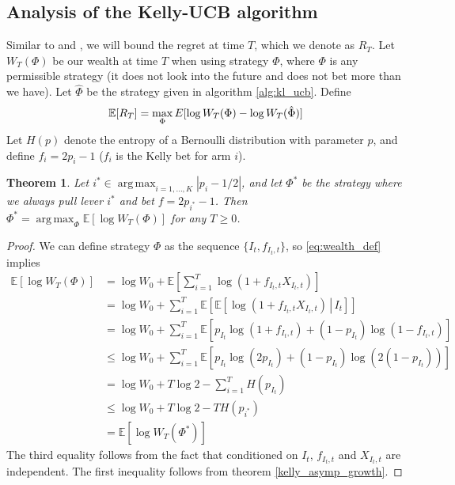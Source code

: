 \documentclass[letterpaper]{article}
\DeclareMathOperator*{\argmax}{arg\,max}
\numberwithin{equation}{section}
\theoremstyle{plain}
\newtheorem{thm}{Theorem}[section]
\begin{document}
\subsection{Analysis of the Kelly-UCB algorithm}\label{analysiskellyucb}
Similar to \cite{cappe2013kullback} and \cite{bubeck2012regret}, we will bound the regret at time $T$, which we denote as $R_T$. Let $W_T(\Phi)$ be our wealth at time $T$ when using strategy $\Phi$, where $\Phi$ is any permissible strategy (it does not look into the future and does not bet more than we have). Let $\hat{\Phi}$ be the strategy given in algorithm \ref{alg:kl_ucb}. Define
\begin{equation}\label{eq:regret_def}
\mathbb{E}[R_T] = \max_\Phi E[\log W_T(\Phi) - \log W_T(\hat{\Phi})]\\
\end{equation}
Let $H(p)$ denote the entropy of a Bernoulli distribution with parameter $p$, and define $f_i = 2p_i-1$ ($f_i$ is the Kelly bet for arm $i$).
\begin{thm}\label{thm:kelly_optimal_mab}
Let $i^*\in\argmax_{i=1,\ldots,K}|p_i-1/2|$, and let $\Phi^*$ be the strategy where we always pull lever $i^*$ and bet $f = 2p_{i^*}-1$. Then $\Phi^* = \argmax_{\Phi} \mathbb{E}[\log W_T(\Phi)]$ for any $T \ge 0$.
\end{thm}
\begin{proof}
We can define strategy $\Phi$ as the sequence $\{I_t,f_{I_t,t}\}$, so \eqref{eq:wealth_def} implies
\begin{align}
\mathbb{E}[\log W_T(\Phi)] &= \log W_0 + \mathbb{E}\left[\sum_{i=1}^T \log(1+f_{I_t,t}X_{I_t,t})\right]\\
&= \log W_0 + \sum_{i=1}^T \mathbb{E}\left[\mathbb{E}\left[\left.\log(1+f_{I_t,t}X_{I_t,t})\,\right\rvert\, I_t\right]\right]\\
&= \log W_0 + \sum_{i=1}^T \mathbb{E}\left[p_{I_t}\log(1+f_{I_t,t})+(1-p_{I_t})\log(1-f_{I_t,t})\right]\\
&\le \log W_0 + \sum_{i=1}^T \mathbb{E}\left[p_{I_t}\log(2p_{I_t})+(1-p_{I_t})\log(2(1-p_{I_t}))\right]\\
&= \log W_0 + T\log 2 - \sum_{i=1}^T H(p_{I_t})\\
&\le \log W_0 + T\log 2 - T H(p_{i^*})\\
&= \mathbb{E}[\log W_T(\Phi^*)]
\end{align}
The third equality follows from the fact that conditioned on $I_t$, $f_{I_t,t}$ and $X_{I_t,t}$ are independent. The first inequality follows from theorem \ref{kelly_asymp_growth}.
\end{proof}
\end{document}
